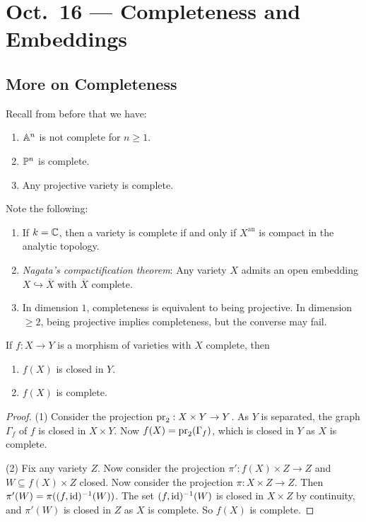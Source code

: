\chapter{Oct.~16 --- Completeness and Embeddings}

\section{More on Completeness}

\begin{example}
  Recall from before that we have:
  \begin{enumerate}
    \item $\mathbb{A}^n$ is not complete for
      $n \ge 1$.
    \item $\mathbb{P}^n$ is complete.
    \item Any projective variety is
      complete.
  \end{enumerate}
\end{example}

\begin{remark}
  Note the following:
  \begin{enumerate}
    \item If $k = \mathbb{C}$, then a variety is
      complete if and only if $X^{\mathrm{an}}$ is compact
      in the analytic topology.
    \item \emph{Nagata's compactification theorem}:
      Any variety $X$ admits an open
      embedding $X \hookrightarrow \overline{X}$
      with $\overline{X}$ complete.
    \item In dimension $1$, completeness
      is equivalent to being projective.
      In dimension $\ge 2$, being projective
      implies completeness, but the converse
      may fail.
  \end{enumerate}
\end{remark}

\begin{prop}
  If $f : X \to Y$ is a morphism of varieties
  with $X$ complete, then
  \begin{enumerate}
    \item $f(X)$ is closed in $Y$.
    \item $f(X)$ is complete.
  \end{enumerate}
\end{prop}

\begin{proof}
  (1) Consider the projection
  $\operatorname{pr}_2 : X \times Y \to Y$. As
  $Y$ is separated, the graph
  $\Gamma_f$ of $f$ is closed in $X \times Y$.
  Now $f(X) = \operatorname{pr}_2(\Gamma_f)$, which is
  closed in $Y$ as $X$ is complete.

  (2) Fix any variety $Z$. Now consider
  the projection
  $\pi' : f(X) \times Z \to Z$ and
  $W \subseteq f(X) \times Z$ closed. Now
  consider the projection $\pi : X \times Z \to Z$.
  Then $\pi'(W) = \pi((f, \operatorname{id})^{-1}(W))$.
  The set $(f, \operatorname{id})^{-1}(W)$ is closed in
  $X \times Z$ by continuity, and
  $\pi'(W)$ is closed in $Z$ as $X$ is complete.
  So $f(X)$ is complete.
\end{proof}

